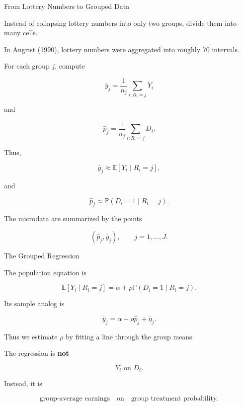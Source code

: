\documentclass[aspectratio=169]{beamer}
\newcommand{\E}{\mathbb{E}}
\newcommand{\Prob}{\mathbb{P}}
\begin{document}
\begin{frame}{From Lottery Numbers to Grouped Data}

Instead of collapsing lottery numbers into only two groups, divide them into many cells.

In Angrist (1990), lottery numbers were aggregated into roughly \(70\) intervals.

For each group \(j\), compute

\[
\bar y_j
=
\frac{1}{n_j}
\sum_{i:R_i=j}Y_i
\]

and

\[
\hat p_j
=
\frac{1}{n_j}
\sum_{i:R_i=j}D_i.
\]

Thus,

\[
\bar y_j
\approx
\E[Y_i\mid R_i=j],
\]

and

\[
\hat p_j
\approx
\Prob(D_i=1\mid R_i=j).
\]

The microdata are summarized by the points

\[
\boxed{
(\hat p_j,\bar y_j),
\qquad j=1,\ldots,J.
}
\]

\end{frame}

\begin{frame}{The Grouped Regression}

The population equation is

\[
\E[Y_i\mid R_i=j]
=
\alpha
+
\rho
\Prob(D_i=1\mid R_i=j).
\]

Its sample analog is

\[
\boxed{
\bar y_j
=
\alpha
+
\rho\hat p_j
+
\bar\eta_j.
}
\]

Thus we estimate \(\rho\) by fitting a line through the group means.

\vspace{0.4cm}

The regression is \textbf{not}

\[
Y_i\text{ on }D_i.
\]

Instead, it is

\[
\boxed{
\text{group-average earnings}
\quad\text{on}\quad
\text{group treatment probability}.
}
\]

\end{frame}
\end{document}
